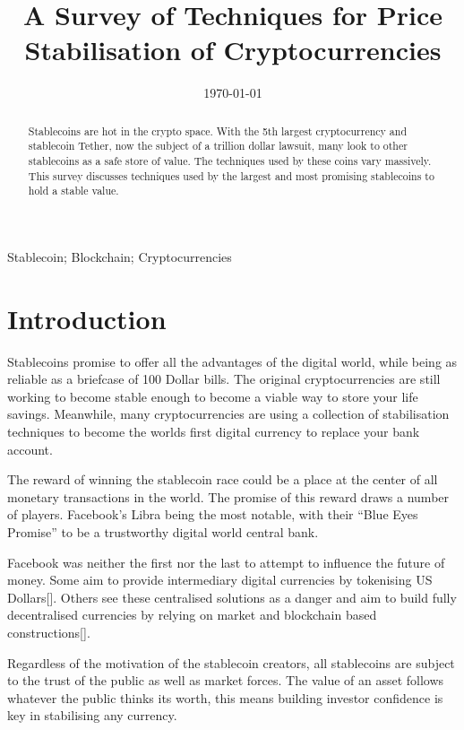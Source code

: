 \documentclass[english,]{IEEEtran}
\title{A Survey of Techniques for Price Stabilisation of Cryptocurrencies}
\author{
            \IEEEauthorblockN{Robert Wessel Blokzijl}
        \IEEEauthorblockA{%
            TU Delft \\
            Delft, The Netherlands \\
            R.W.Blokzijl@student.tudelft.nl}
        }
\date{\today}
\begin{document}
\maketitle
\begin{abstract}
Stablecoins are hot in the crypto space. With the 5th largest
cryptocurrency and stablecoin Tether, now the subject of a trillion
dollar lawsuit, many look to other stablecoins as a safe store of value.
The techniques used by these coins vary massively. This survey discusses
techniques used by the largest and most promising stablecoins to hold a
stable value.
\end{abstract}

\begin{IEEEkeywords}
    Stablecoin;
    Blockchain;
    Cryptocurrencies\end{IEEEkeywords}

\section{Introduction}\label{introduction}

Stablecoins promise to offer all the advantages of the digital world,
while being as reliable as a briefcase of 100 Dollar bills. The original
cryptocurrencies are still working to become stable enough to become a
viable way to store your life savings. Meanwhile, many cryptocurrencies
are using a collection of stabilisation techniques to become the worlds
first digital currency to replace your bank account.

The reward of winning the stablecoin race could be a place at the center
of all monetary transactions in the world. The promise of this reward
draws a number of players. Facebook's Libra being the most notable, with
their ``Blue Eyes Promise'' to be a trustworthy digital world central
bank.

Facebook was neither the first nor the last to attempt to influence the
future of money. Some aim to provide intermediary digital currencies by
tokenising US Dollars{[}{]}. Others see these centralised solutions as a
danger and aim to build fully decentralised currencies by relying on
market and blockchain based constructions{[}{]}.

Regardless of the motivation of the stablecoin creators, all stablecoins
are subject to the trust of the public as well as market forces. The
value of an asset follows whatever the public thinks its worth, this
means building investor confidence is key in stabilising any currency.
\end{document}
